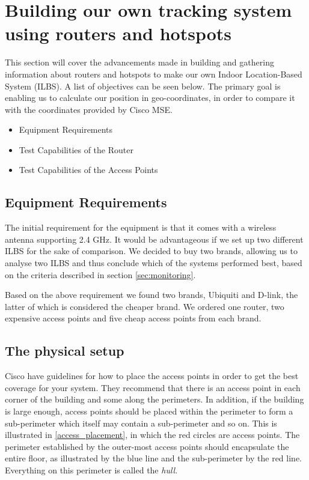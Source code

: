 \section{Building our own tracking system using routers and hotspots}
This section will cover the advancements made in building and gathering information about routers and hotspots to make our own Indoor Location-Based System (ILBS). A list of objectives can be seen below. The primary goal is enabling us to calculate our position in geo-coordinates, in order to compare it with the coordinates provided by Cisco MSE.

\begin{itemize}
	\item Equipment Requirements
	\item Test Capabilities of the Router 
	\item Test Capabilities of the Access Points
\end{itemize}

\subsection*{Equipment Requirements}
The initial requirement for the equipment is that it comes with a wireless antenna supporting 2.4 GHz. It would be advantageous if we set up two different ILBS for the sake of comparison. We decided to buy two brands, allowing us to analyse two ILBS and thus conclude which of the systems performed best, based on the criteria described in section \ref{sec:monitoring}.

Based on the above requirement we found two brands, Ubiquiti and D-link, the latter of which is considered the cheaper brand. We ordered one router, two expensive access points and five cheap access points from each brand.

\subsection*{The physical setup}
Cisco\cite{access_point_placement} have guidelines for how to place the access points in order to get the best coverage for your system. They recommend that there is an access point in each corner of the building and some along the perimeters. In addition, if the building is large enough, access points should be placed within the perimeter to form a sub-perimeter which itself may contain a sub-perimeter and so on. This is illustrated in \cref{access_placement}, in which the red circles are access points. The perimeter established by the outer-most access points should encapsulate the entire floor, as illustrated by the blue line and the sub-perimeter by the red line. Everything on this perimeter is called the \textit{hull}\cite{access_point_placement}.


